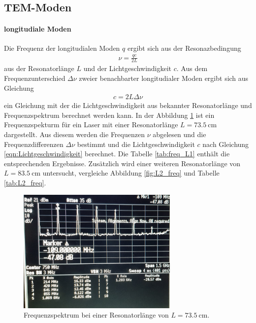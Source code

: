 \subsection{TEM-Moden}
\label{subsec:tem}
\paragraph{longitudiale Moden}
Die Frequenz der longitudialen Moden $q$
ergibt sich aus der Resonazbedingung
\begin{align}
  \nu=\frac{qc}{2L} \label{eqn:longi_mode}
\end{align}
aus der Resonatorlänge $L$ und der Lichtgeschwindigkeit $c$.
Aus dem Frequenzunterschied $\Delta \nu$ zweier benachbarter longitudialer Moden
ergibt sich aus Gleichung \label{eqn:longi_mode}
\begin{align}
  c = 2L\Delta \nu  \label{eqn:Lichtgeschwindigkeit}
\end{align}
ein Gleichung mit der die Lichtgeschwindigkeit aus bekannter Resonatorlänge und Frequenzspektrum
berechnet werden kann.
In der Abbildung \ref{fig:L1_freq} ist ein Frequenzspekturm für ein Laser mit einer Resonatorlänge $L=\SI{73.5}{\centi\meter}$
dargestellt. Aus diesem werden die Frequenzen $\nu$ abgelesen
 und die Frequenzdifferenzen $\Delta \nu $ bestimmt und die Lichtgeschwindigkeit $c$ nach Gleichung \ref{eqn:Lichtgeschwindigkeit}
berechnet.
Die Tabelle \ref{tab:freq_L1} enthält die entsprechenden Ergebnisse.
Zusätzlich wird einer weiteren Resonatorlänge von $L = \SI{83.5}{\centi\meter}$  untersucht,
vergleiche Abbildung \ref{fig:L2_freq} und Tabelle \ref{tab:L2_freq}.

\begin{figure}
\centering
  \includegraphics[width=0.7\textwidth]{pictures/freq_1.jpg}
  \caption{Frequenzspektrum bei einer Resonatorlänge von $L=\SI{73.5}{\centi\meter}$.}
  \label{fig:L1_freq}
\end{figure}

